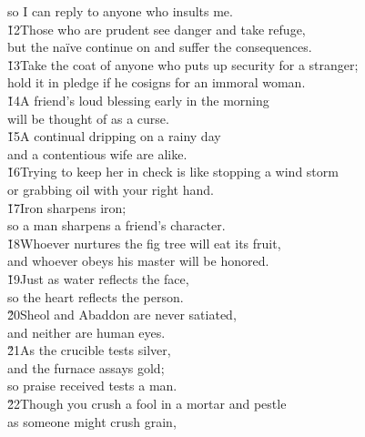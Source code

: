 \begin{poetry}
\poemll    so I can reply to anyone who insults me. \\
\poeml \v{12}Those who are prudent see danger and take refuge, \\
\poemll    but the na\"{i}ve continue on and suffer the consequences. \\
\poeml \v{13}Take the coat of anyone who puts up security for a stranger; \\
\poemll    hold it in pledge if he cosigns for an immoral woman. \\
\poeml \v{14}A friend's loud blessing early in the morning \\
\poemll    will be thought of as a curse. \\
\poeml \v{15}A continual dripping on a rainy day \\
\poemll    and a contentious wife are alike. \\
\poeml \v{16}Trying to keep her in check is like stopping a wind storm \\
\poemll    or grabbing oil with your right hand. \\
\poeml \v{17}Iron sharpens iron; \\
\poemll    so a man sharpens a friend's character. \\
\poeml \v{18}Whoever nurtures the fig tree will eat its fruit, \\
\poemll    and whoever obeys his master will be honored. \\
\poeml \v{19}Just as water reflects the face, \\
\poemll    so the heart reflects the person. \\
\poeml \v{20}Sheol and Abaddon are never satiated, \\
\poemll    and neither are human eyes. \\
\poeml \v{21}As the crucible tests silver, \\
\poemll    and the furnace assays gold; \\
\poemlll       so praise received tests a man. \\
\poeml \v{22}Though you crush a fool in a mortar and pestle \\
\poemll    as someone might crush grain, \\

\end{poetry}
